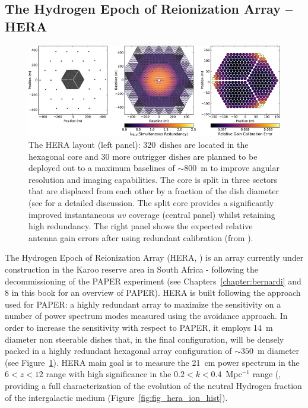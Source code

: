 \subsection{The Hydrogen Epoch of Reionization Array -- HERA}
\label{sub_sec:hera}
%
\begin{figure}[]
\begin{center}
\includegraphics[width=1.\textwidth]{Koopmans_Bernardi/hera_layout}
\end{center}
\caption{The HERA layout (left panel): 320~dishes are located in the hexagonal core and 30 more outrigger dishes are planned to be deployed out to a maximum baselines of $\sim 800$~m to improve angular resolution and imaging capabilities. The core is split in three sectors that are displaced from each other by a fraction of the dish diameter (see \cite{dillon16} for a detailed discussion. The split core provides a significantly improved instantaneous $uv$ coverage (central panel) whilst retaining high redundancy. The right panel shows the expected relative antenna gain errors after using redundant calibration (from \cite{dillon16}).}
\label{fig:fig_hera}
\end{figure}
The Hydrogen Epoch of Reionization Array (HERA, \cite{deboer17}) is an array currently under construction in the Karoo reserve area in South Africa - following the decommissioning of the PAPER experiment (see Chapters~\ref{chapter:bernardi} and 8 in this book for an overview of PAPER). HERA is built following the approach used for PAPER: a highly redundant array to maximize the sensitivity on a number of power spectrum modes measured using the avoidance approach. In order to increase the sensitivity with respect to PAPER, it employs 14~m diameter non steerable dishes that, in the final configuration, will be densely packed in a highly redundant hexagonal array configuration of $\sim 350$~m diameter (see Figure~\ref{fig:fig_hera}). 
HERA main goal is to measure the 21~cm power spectrum in the $6 < z < 12 $ range with high significance in the $0.2 < k < 0.4$~Mpc$^{-1}$ range (\cite{pober14}, providing a full characterization of the evolution of the neutral Hydrogen fraction of the intergalactic medium (Figure~\ref{fig:fig_hera_ion_hist}).
